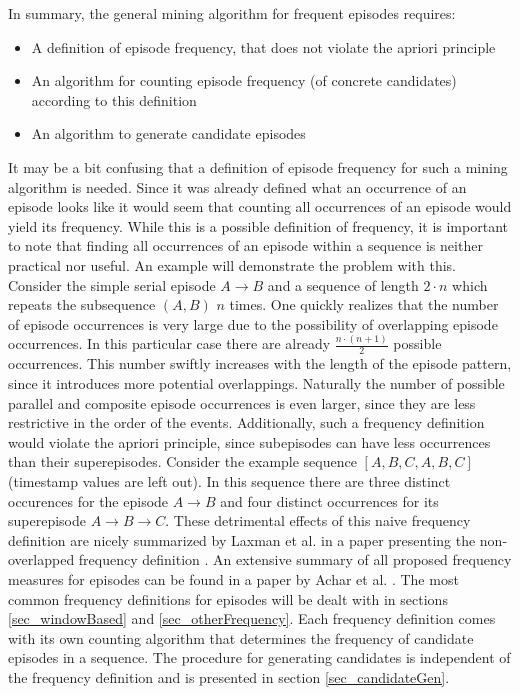 In summary, the general mining algorithm for frequent episodes requires:

\begin{itemize}
	\item A definition of episode frequency, that does not violate the apriori principle
	\item An algorithm for counting episode frequency (of concrete candidates) according to this definition
	\item An algorithm to generate candidate episodes
\end{itemize}

It may be a bit confusing that a definition of episode frequency for such a mining algorithm is needed. Since it was already defined what an occurrence of an episode looks like it would seem that counting all occurrences of an episode would yield its frequency. While this is a possible definition of frequency, it is important to note that finding all occurrences of an episode within a sequence is neither practical nor useful. An example will demonstrate the problem with this. Consider the simple serial episode $A \rightarrow B$ and a sequence of length $2\cdot n$ which repeats the subsequence $(A,B)$ $n$ times. One quickly realizes that the number of episode occurrences is very large due to the possibility of overlapping episode occurrences. In this particular case there are already $ \frac{n \cdot (n+1)}{2}$ possible occurrences. This number swiftly increases with the length of the episode pattern, since it introduces more potential overlappings. Naturally the number of possible parallel and composite episode occurrences is even larger, since they are less restrictive in the order of the events. Additionally, such a frequency definition would violate the apriori principle, since subepisodes can have less occurrences than their superepisodes. Consider the example sequence $[A,B,C,A,B,C]$ (timestamp values are left out). In this sequence there are three distinct occurences for the episode $A \rightarrow B$ and four distinct occurrences for its superepisode $A \rightarrow B \rightarrow C$. These detrimental effects of this naive frequency definition are nicely summarized by Laxman et al. in a paper presenting the non-overlapped frequency definition \cite{laxman2007fast}. \newline
An extensive summary of all proposed frequency measures for episodes can be found in a paper by Achar et al. \cite{achar2012unified}. The most common frequency definitions for episodes will be dealt with in sections \ref{sec_windowBased} and \ref{sec_otherFrequency}. Each frequency definition comes with its own counting algorithm that determines the frequency of candidate episodes in a sequence. The procedure for generating candidates is independent of the frequency definition and is presented in section \ref{sec_candidateGen}. \newline


